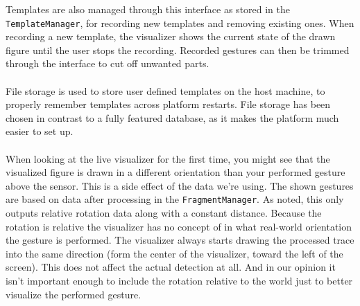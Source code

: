 \documentclass{standalone}
\begin{document}
  Templates are also managed through this interface as stored in the
  \verb_TemplateManager_, for recording new templates and removing existing
  ones. When recording a new template, the visualizer shows the current state
  of the drawn figure until the user stops the recording. Recorded gestures can
  then be trimmed through the interface to cut off unwanted parts.

  \paragraph{}
  File storage is used to store user defined templates on the host machine, to
  properly remember templates across platform restarts. File storage has been
  chosen in contrast to a fully featured database, as it makes the platform much
  easier to set up.

  \paragraph{}
  When looking at the live visualizer for the first time, you might see that the
  visualized figure is drawn in a different orientation than your performed
  gesture above the sensor. This is a side effect of the data we're using. The
  shown gestures are based on data after processing in the
  \verb_FragmentManager_. As noted, this only outputs relative rotation data
  along with a constant distance. Because the rotation is relative the
  visualizer has no concept of in what real-world orientation the gesture is
  performed. The visualizer always starts drawing the processed trace into the
  same direction (form the center of the visualizer, toward the left of the
  screen). This does not affect the actual detection at all. And in our opinion
  it isn't important enough to include the rotation relative to the world just
  to better visualize the performed gesture.

  \clearpage
\end{document}
